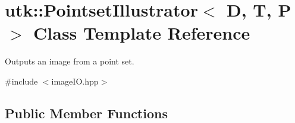 \hypertarget{classutk_1_1PointsetIllustrator}{\section{utk\-:\-:Pointset\-Illustrator$<$ D, T, P $>$ Class Template Reference}
\label{classutk_1_1PointsetIllustrator}
}


Outputs an image from a point set.  




{\ttfamily \#include $<$image\-I\-O.\-hpp$>$}

\subsection*{Public Member Functions}
